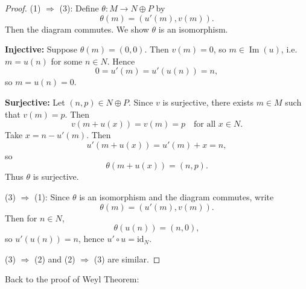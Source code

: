 \begin{proof}
    (1) $\Rightarrow$ (3): Define $\theta : M \to N \oplus P$ by
    \[
        \theta(m) = (u'(m), v(m)).
    \]
    Then the diagram commutes. We show $\theta$ is an isomorphism.

    \textbf{Injective:} Suppose $\theta(m) = (0,0)$. Then $v(m)=0$, so $m \in \operatorname{Im}(u)$, i.e. $m = u(n)$ for some $n \in N$. Hence
    \[
        0 = u'(m) = u'(u(n)) = n,
    \]
    so $m = u(n) = 0$.

    \textbf{Surjective:} Let $(n,p) \in N \oplus P$. Since $v$ is surjective, there exists $m \in M$ such that $v(m)=p$. Then
    \[
        v(m + u(x)) = v(m) = p \quad \text{for all } x \in N.
    \]
    Take $x = n - u'(m)$. Then
    \[
        u'(m + u(x)) = u'(m) + x = n,
    \]
    so
    \[
        \theta(m + u(x)) = (n,p).
    \]
    Thus $\theta$ is surjective.

    (3) $\Rightarrow$ (1): Since $\theta$ is an isomorphism and the diagram commutes, write
    \[
        \theta(m) = (u'(m), v(m)).
    \]
    Then for $n \in N$,
    \[
        \theta(u(n)) = (n,0),
    \]
    so $u'(u(n)) = n$, hence $u' \circ u = \mathrm{id}_N$.

    (3) $\Rightarrow$ (2) and (2) $\Rightarrow$ (3) are similar.
\end{proof}

Back to the proof of Weyl Theorem:

